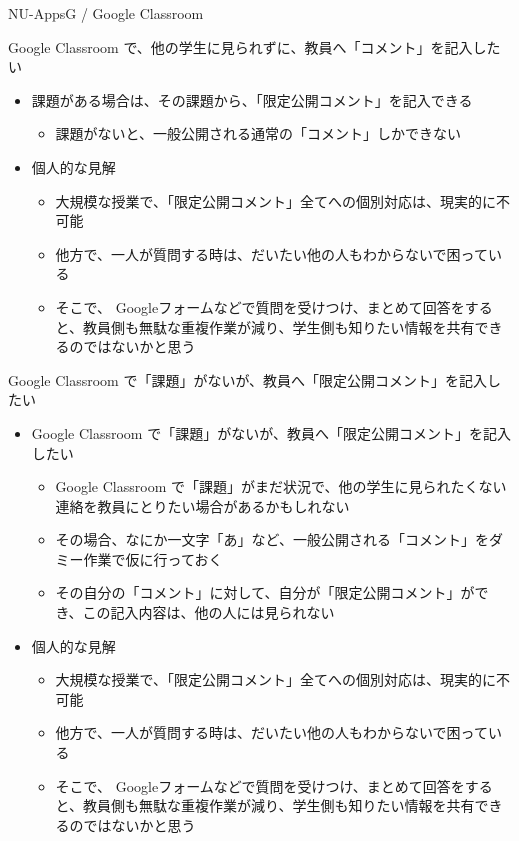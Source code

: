 \documentclass[a4j,10pt]{jsarticle}
\begin{document}
{\begin{frame}[label={sec:orgbe869cf},fragile]{NU-AppsG / Google Classroom}
\begin{block}{Google Classroom で、他の学生に見られずに、教員へ「コメント」を記入したい}
\begin{itemize}
\begin{itemize}
個々の質問（課題から可能） (課題については、宛先を教員に限定した質問をすることができます。)
\end{itemize}
\par
\item 課題がある場合は、その課題から、「限定公開コメント」を記入できる
\begin{itemize}
\item 課題がないと、一般公開される通常の「コメント」しかできない
\end{itemize}
\par
\item 個人的な見解
\begin{itemize}
\item 大規模な授業で、「限定公開コメント」全てへの個別対応は、現実的に不可能
\item 他方で、一人が質問する時は、だいたい他の人もわからないで困っている
\item そこで、 Googleフォームなどで質問を受けつけ、まとめて回答をすると、教員側も無駄な重複作業が減り、学生側も知りたい情報を共有できるのではないかと思う
\end{itemize}
\end{itemize}
\end{block}
\par
\begin{block}{Google Classroom で「課題」がないが、教員へ「限定公開コメント」を記入したい}
\begin{itemize}
\item Google Classroom で「課題」がないが、教員へ「限定公開コメント」を記入したい
\begin{itemize}
\item Google Classroom で「課題」がまだ状況で、他の学生に見られたくない連絡を教員にとりたい場合があるかもしれない
\item その場合、なにか一文字「あ」など、一般公開される「コメント」をダミー作業で仮に行っておく
\item その自分の「コメント」に対して、自分が「限定公開コメント」ができ、この記入内容は、他の人には見られない
\end{itemize}
\par
\item 個人的な見解
\begin{itemize}
\item 大規模な授業で、「限定公開コメント」全てへの個別対応は、現実的に不可能
\item 他方で、一人が質問する時は、だいたい他の人もわからないで困っている
\item そこで、 Googleフォームなどで質問を受けつけ、まとめて回答をすると、教員側も無駄な重複作業が減り、学生側も知りたい情報を共有できるのではないかと思う

\end{itemize}
\end{itemize}
\end{block}
\end{frame}}
\end{document}
